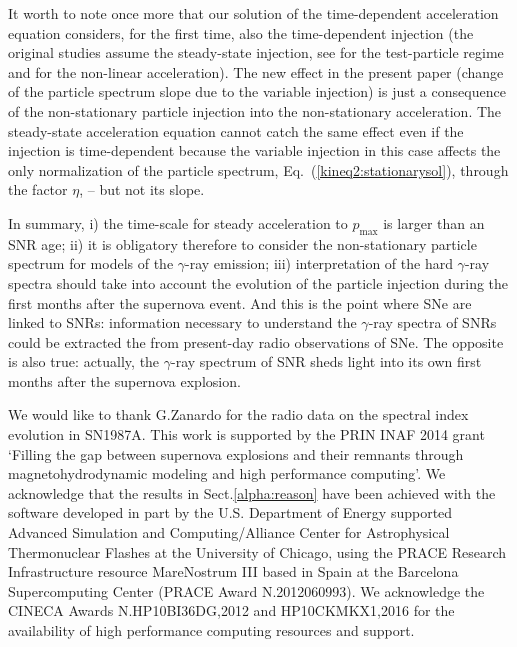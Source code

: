 \documentclass{aa}
\newcommand\rs[1]{_\mathrm{#1}}
\newcommand\g{$\gamma$}
\begin{document}
It worth to note once more that our solution of the time-dependent acceleration equation considers, for the first time, also the time-dependent injection (the original studies assume the steady-state injection, see \citet{Drury-1983} for the test-particle regime and \citet{Blasi-etal-2007} for the non-linear acceleration). The new effect in the present paper (change of the particle spectrum slope due to the variable injection) is just a consequence of the non-stationary particle injection into the non-stationary acceleration. The steady-state acceleration equation cannot catch the same effect even if the injection is time-dependent because the variable injection in this case affects the only normalization of the particle spectrum, Eq.~(\ref{kineq2:stationarysol}), through the factor $\eta$, -- but not its slope.

In summary, i) the time-scale for steady acceleration to $p\rs{max}$ is larger than an SNR age; ii) it is obligatory therefore to consider the non-stationary particle
spectrum for models of the $\gamma$-ray emission; iii) interpretation of the hard \g-ray spectra should take into account the evolution of the particle injection during the first months after the supernova event. And this is the point where SNe are linked to SNRs: information necessary to understand the \g-ray spectra of SNRs could be extracted the from present-day radio observations of SNe. The opposite is also true: actually, the \g-ray spectrum of SNR sheds light into its own first months after the supernova explosion. 


\begin{acknowledgements}
We would like to thank G.Zanardo for the radio data on the spectral index evolution in SN1987A.  
This work is supported by the PRIN INAF 2014 grant `Filling the gap between supernova explosions and their remnants through magnetohydrodynamic modeling and high performance computing'. 
We acknowledge that the results in Sect.\ref{alpha:reason} have been achieved with the software developed in part by the U.S. Department of Energy supported Advanced Simulation and Computing/Alliance Center for Astrophysical Thermonuclear Flashes at the University of Chicago, using the PRACE Research Infrastructure resource MareNostrum III based in Spain at the Barcelona Supercomputing Center (PRACE Award N.2012060993). We acknowledge the CINECA Awards N.HP10BI36DG,2012 and HP10CKMKX1,2016 for the availability of high performance computing resources and support.
\end{acknowledgements}
\end{document}
